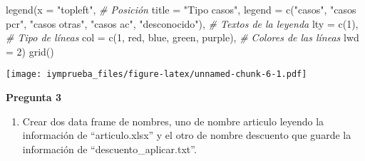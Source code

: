 \documentclass[
  12pt,
]{article}
\newenvironment{Shaded}{\begin{snugshade}}{\end{snugshade}}
\newcommand{\AttributeTok}[1]{\textcolor[rgb]{0.77,0.63,0.00}{#1}}
\newcommand{\CommentTok}[1]{\textcolor[rgb]{0.56,0.35,0.01}{\textit{#1}}}
\newcommand{\DecValTok}[1]{\textcolor[rgb]{0.00,0.00,0.81}{#1}}
\newcommand{\FunctionTok}[1]{\textcolor[rgb]{0.00,0.00,0.00}{#1}}
\newcommand{\NormalTok}[1]{#1}
\newcommand{\StringTok}[1]{\textcolor[rgb]{0.31,0.60,0.02}{#1}}
\providecommand{\tightlist}{%
  \setlength{\itemsep}{0pt}\setlength{\parskip}{0pt}}
\begin{document}
\begin{Shaded}
\begin{Highlighting}[]
\FunctionTok{legend}\NormalTok{(}\AttributeTok{x =} \StringTok{"topleft"}\NormalTok{,         }\CommentTok{\# Posición}
       \AttributeTok{title =} \StringTok{"Tipo casos"}\NormalTok{,}
       \AttributeTok{legend =} \FunctionTok{c}\NormalTok{(}\StringTok{"casos"}\NormalTok{, }\StringTok{"casos pcr"}\NormalTok{, }\StringTok{"casos otras"}\NormalTok{, }\StringTok{"casos ac"}\NormalTok{, }\StringTok{"desconocido"}\NormalTok{), }\CommentTok{\# Textos de la leyenda}
       \AttributeTok{lty =} \FunctionTok{c}\NormalTok{(}\DecValTok{1}\NormalTok{),          }\CommentTok{\# Tipo de líneas}
       \AttributeTok{col =} \FunctionTok{c}\NormalTok{(}\DecValTok{1}\NormalTok{, }\StringTok{\textquotesingle{}red\textquotesingle{}}\NormalTok{, }\StringTok{\textquotesingle{}blue\textquotesingle{}}\NormalTok{, }\StringTok{\textquotesingle{}green\textquotesingle{}}\NormalTok{, }\StringTok{\textquotesingle{}purple\textquotesingle{}}\NormalTok{),          }\CommentTok{\# Colores de las líneas}
       \AttributeTok{lwd =} \DecValTok{2}\NormalTok{)   }
\FunctionTok{grid}\NormalTok{()}
\end{Highlighting}
\end{Shaded}

\texttt{[image: iymprueba\_files/figure-latex/unnamed-chunk-6-1.pdf]}

\textbf{Pregunta 3}

\begin{enumerate}
\def\labelenumi{\alph{enumi})}
\tightlist
\item
  Crear dos data frame de nombres, uno de nombre articulo leyendo la
  información de ``articulo.xlsx'' y el otro de nombre descuento que
  guarde la información de ``descuento\_aplicar.txt''.
\end{enumerate}
\end{document}
